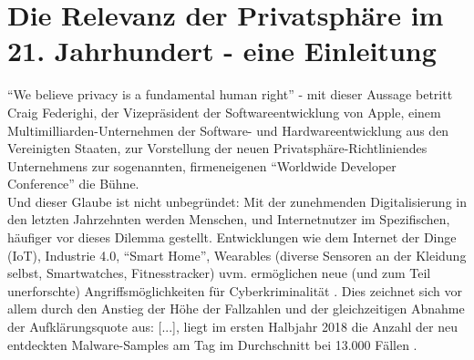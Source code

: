 \chapter{Die Relevanz der Privatsphäre im 21. Jahrhundert - eine Einleitung} %
\label{Introduction} %

\enquote{We believe privacy is a fundamental human right} \cite{Apple 2020: 55:30 - 55:35} - mit dieser Aussage betritt Craig Federighi, der Vizepräsident der Softwareentwicklung von Apple, einem Multimilliarden-Unternehmen der Software- und Hardwareentwicklung aus den Vereinigten Staaten, zur Vorstellung der 
neuen Privatsphäre-Richtliniendes Unternehmens zur sogenannten, firmeneigenen \enquote{Worldwide Developer Conference} die Bühne. \\ Und dieser Glaube ist nicht unbegründet: Mit der zunehmenden Digitalisierung in den letzten Jahrzehnten werden Menschen, und Internetnutzer im Spezifischen, 
häufiger vor dieses Dilemma gestellt. Entwicklungen wie dem Internet der Dinge (IoT), Industrie 4.0, \enquote{Smart Home}, Wearables (diverse Sensoren an der Kleidung selbst, Smartwatches, Fitnesstracker) uvm. ermöglichen neue (und zum Teil unerforschte) Angriffsmöglichkeiten für Cyberkriminalität \cite{Bundeslagebild 2018: S. 52}.
Dies zeichnet sich vor allem durch den Anstieg der Höhe der Fallzahlen und der gleichzeitigen Abnahme der Aufklärungsquote aus: [...], liegt im ersten Halbjahr 2018 die Anzahl der neu entdeckten Malware-Samples am Tag im Durchschnitt bei 13.000 Fällen \cite{G DATA-Blog 2018}.